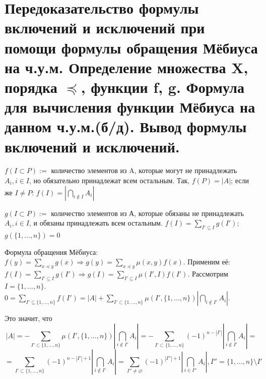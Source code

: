 \section{Передоказательство формулы включений и исключений при помощи формулы обращения Мёбиуса на ч.у.м. Определение множества X, порядка $\preceq$, функции f, g. Формула для вычисления функции Мёбиуса на данном ч.у.м.(б/д). Вывод формулы включений и исключений.}

$f(I \subset P) :=$ количество элементов из A, которые могут не принадлежать $A_i, i \in I$, но обязательно принадлежат всем остальным. Так, $f(P) = |A|$; если же $I \neq P$: $f(I) = |\bigcap_{i \notin I} A_i|$ \par
$g(I \subset P) :=$ количество элементов из А, которые обязаны не принадлежать $A_i, i \in I$, и обязаны принадлежать всем остальным. $f(I) = \sum_{I' \subseteq I} g(I')$; $g(\{1, \dots, n\}) = 0$\par 
Формула обращения Мёбиуса: $f(y) = \sum_{x\preceq y}g(x) \Rightarrow g(y) = \sum_{x \preceq y} \mu(x, y)f(x)$. Применим её:
$ f(I) = \sum_{I' \subseteq I}g(I') \Rightarrow g(I) = \sum_{I' \subseteq I} \mu(I', I)f(I')$.
Рассмотрим $I = \{1, \dots, n\}$. $0 = \sum_{I' \subseteq \{1, \dots, n\}}f(I') = |A| + \sum_{I' \subset \{1, \dots, n\}}\mu(I', \{1, \dots, n\})|\bigcap_{i \notin I'} A_i|$. \par
Это значит, что 
\[ |A| = - \sum_{I' \subset \{1, \dots, n\}}\mu(I', \{1, \dots, n\})|\bigcap_{i \notin I'} A_i| = - \sum_{I' \subset \{1, \dots, n\}} (-1)^{n-|I'|} |\bigcap_{i \notin I'} A_i| =\] \[= \sum_{I' \subset \{1, \dots, n\}} (-1)^{n-|I'| + 1} |\bigcap_{i \notin I'} A_i| = \sum_{I'' \neq \varnothing} (-1)^{|I''|+1} |\bigcap_{i \in I''} A_i|, I'' = \{1, \dots, n\} \setminus I'\]